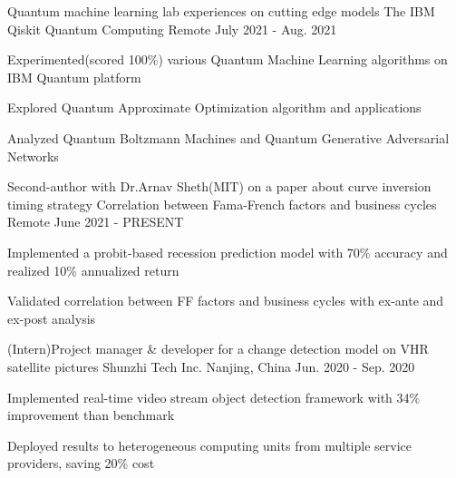 \begin{cventries}
  \cventry
    {Quantum machine learning lab experiences on cutting edge models}
    {The IBM Qiskit Quantum Computing}
    {Remote}
    {July 2021 - Aug. 2021}
    {
      \begin{cvitems}
        \item {Experimented(scored 100\%) various Quantum Machine Learning algorithms on IBM Quantum platform}
        \item {Explored Quantum Approximate Optimization algorithm and applications}
        \item {Analyzed Quantum Boltzmann Machines and Quantum Generative Adversarial Networks}
      \end{cvitems}
    }

  \cventry
    {Second-author with Dr.Arnav Sheth(MIT) on a paper about curve inversion timing strategy}
    {Correlation between Fama-French factors and business cycles}
    {Remote}
    {June 2021 - PRESENT}
    {
      \begin{cvitems}
        \item {Implemented a probit-based recession prediction model with 70\% accuracy and realized 10\% annualized return}
        \item {Validated correlation between FF factors and business cycles with ex-ante and ex-post analysis}
      \end{cvitems}
    }

    \begin{comment}
    \cventry
    {Full-stack development for an event-driven quantitative trading simulation}
    {Quantitative trading PaaS}
    {Remote}
    {Sep. 2020 - PRESENT}
    {
      \begin{cvitems}
        \item {Implemented benchmark tools based upon ARIMA and Prophet}
        \item {Designed UI\&UX with quantified alpha/beta testing, improving user experience}
        \item {Proposed low latency APIs that allow high frequency trading via HTTP}
      \end{cvitems}
    }
    \end{comment}

  \cventry
    {(Intern)Project manager \& developer for a change detection model on VHR satellite pictures}
    {Shunzhi Tech Inc.}
    {Nanjing, China}
    {Jun. 2020 - Sep. 2020}
    {
      \begin{cvitems}
        \item {Implemented real-time video stream object detection framework with 34\% improvement than benchmark}
        \item {Deployed results to heterogeneous computing units from multiple service providers, saving 20\% cost}
      \end{cvitems}
    }


\end{cventries}
